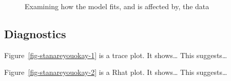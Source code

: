 \documentclass[
  letterpaper,
  DIV=11,
  numbers=noendperiod]{scrartcl}
\begin{document}
\begin{figure}
\begin{minipage}[t]{0.50\linewidth}
{{}

}

\end{minipage}%

\caption{\label{fig-ppcheckandposteriorvsprior}Examining how the model
fits, and is affected by, the data}

\end{figure}

\hypertarget{diagnostics}{%
\subsection{Diagnostics}\label{diagnostics}}

Figure~\ref{fig-stanareyouokay-1} is a trace plot. It shows\ldots{} This
suggests\ldots{}

Figure~\ref{fig-stanareyouokay-2} is a Rhat plot. It shows\ldots{} This
suggests\ldots{}
\end{document}

